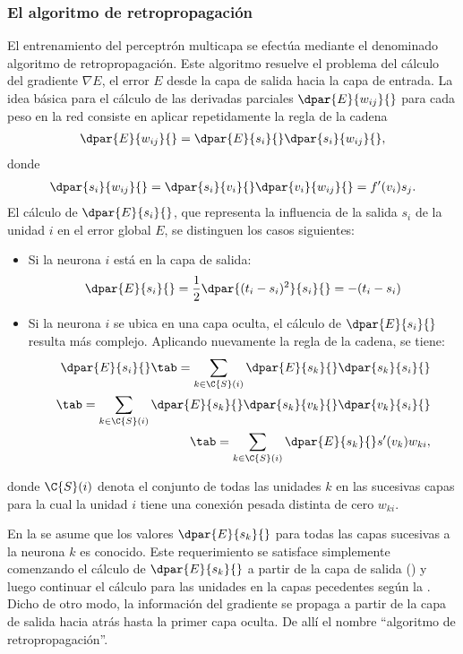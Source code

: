 \subsubsection{El algoritmo de retropropagación}
%
El entrenamiento del perceptrón multicapa se efectúa mediante el denominado
algoritmo de retropropagación.
Este algoritmo resuelve el problema del cálculo del gradiente
$\nabla E$,  el error $E$ desde la capa de salida hacia la
capa de entrada. La idea básica para el cálculo de las derivadas
parciales $\dpar{E}{w_{ij}}{}$ para cada peso en la red consiste en
aplicar repetidamente la regla de la cadena
%
\begin{align}
  \dpar{E}{w_{ij}}{} = \dpar{E}{s_{i}}{}\dpar{s_i}{w_{ij}}{},
\end{align}
%
donde
%
\begin{align}
  \dpar{s_i}{w_{ij}}{} = \dpar{s_i}{v_{i}}{}\dpar{v_i}{w_{ij}}{} =
  f'(v_i) s_j .
\end{align}
%
El cálculo de $\dpar{E}{s_i}{}$, que representa la influencia
de la salida $s_i$ de la unidad $i$ en el error global $E$,
se distinguen los casos siguientes:
%
\begin{itemize}
\item Si la neurona $i$ está en la capa de salida:
  \begin{align}\label{mlp4}
    \dpar{E}{s_i}{}=\frac{1}{2}\dpar{(t_i-s_i)^2}{s_i}{}=-(t_i-s_i)
  \end{align}
\item Si la neurona $i$ se ubica en una capa oculta, el cálculo de
  $\dpar{E}{s_i}{}$ resulta más complejo. Aplicando nuevamente la
  regla de la cadena, se tiene:
  \begin{align}\label{mlp5}
    \dpar{E}{s_i}{} \tab= \sum_{k\in\C{S}(i)}
      \dpar{E}{s_k}{}\dpar{s_k}{s_i}{} \notag\\
    \tab= \sum_{k\in\C{S}(i)}
      \dpar{E}{s_k}{}\dpar{s_k}{v_k}{}\dpar{v_k}{s_i}{} \notag\\
    \tab= \sum_{k\in\C{S}(i)} \dpar{E}{s_k}{} s'(v_k) w_{ki},
  \end{align}
\end{itemize}
donde $\C{S}(i)$ denota el conjunto de todas las unidades $k$ en las
sucesivas capas para la cual la unidad $i$ tiene una conexión
pesada distinta de cero $w_{ki}$.

En la  se asume que los valores $\dpar{E}{s_k}{}$ para todas
las capas sucesivas a la neurona $k$ es conocido. Este requerimiento
se satisface simplemente comenzando el cálculo de $\dpar{E}{s_k}{}$ a
partir de la capa de salida () y luego continuar el cálculo
para las unidades en la capas pecedentes según la .  Dicho de
otro modo, la información del gradiente se propaga a partir de la capa
de salida hacia atrás hasta la primer capa oculta. De allí el nombre
``algoritmo de retropropagación''.

